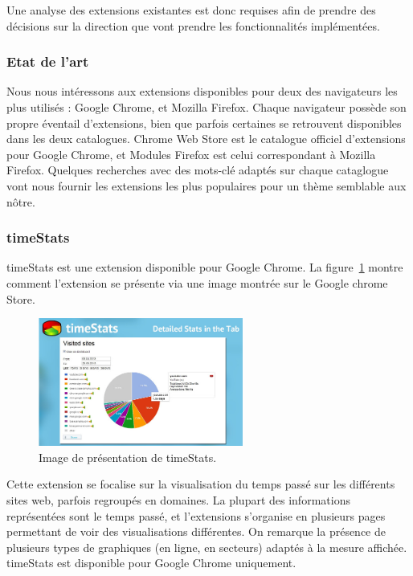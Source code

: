 			Une analyse des extensions existantes est donc requises afin de prendre des décisions sur la direction que vont prendre les fonctionnalités implémentées.

		\subsubsection{Etat de l'art}

			Nous nous intéressons aux extensions disponibles pour deux des navigateurs les plus utilisés : Google Chrome, et Mozilla Firefox. Chaque navigateur possède son propre éventail d'extensions, bien que parfois certaines se retrouvent disponibles dans les deux catalogues. Chrome Web Store\cite{chromewebstore} est le catalogue officiel d'extensions pour Google Chrome, et Modules Firefox\cite{modulesfirefox} est celui correspondant à Mozilla Firefox. Quelques recherches avec des mots-clé adaptés sur chaque cataglogue vont nous fournir les extensions les plus populaires pour un thème semblable aux nôtre.

			\subsubsection{timeStats}

				timeStats\cite{timestats} est une extension disponible pour Google Chrome. La figure~\ref{a-timestats} montre comment l'extension se présente via une image montrée sur le Google chrome Store.

				\begin{figure}[ht]
					\centering
					\includegraphics[width=0.6\textwidth]{images/analysis/timestats}
					\caption{Image de présentation de timeStats\cite{timestats}.}
					\label{a-timestats}
				\end{figure}

				Cette extension se focalise sur la visualisation du temps passé sur les différents sites web, parfois regroupés en domaines. La plupart des informations représentées sont le temps passé, et l'extensions s'organise en plusieurs pages permettant de voir des visualisations différentes. On remarque la présence de plusieurs types de graphiques (en ligne, en secteurs) adaptés à la mesure affichée. timeStats est disponible pour Google Chrome uniquement.

